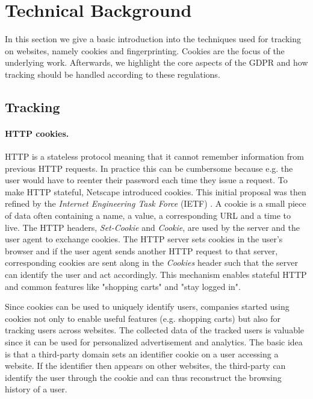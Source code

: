 \section{Technical Background}
\label{sec:background}

In this section we give a basic introduction into the techniques used for tracking on websites, namely cookies and
fingerprinting. Cookies are the focus of the underlying work. Afterwards, we highlight
the core aspects of the GDPR and how tracking should be handled according to these regulations.

\subsection{Tracking}

\paragraph{HTTP cookies.}

HTTP is a stateless protocol meaning that it cannot remember information from previous HTTP requests. In practice this
can be cumbersome because e.g. the user would have to reenter their password each time they issue a request.
To make HTTP stateful, Netscape introduced cookies. This initial proposal was then refined by the
\emph{Internet Engineering Task Force} (IETF) \cite{rfc6265}. A cookie is a small piece of data often containing a name,
a value, a corresponding URL and a time to live. The HTTP headers, \emph{Set-Cookie} and \emph{Cookie}, are used by the server and the user agent to
exchange cookies. The HTTP server sets cookies in the user's browser and if the user agent sends another HTTP
request to that server, corresponding cookies are sent along in the \emph{Cookies} header such that the server can identify the user and act accordingly. This
mechanism enables stateful HTTP and common features like "shopping carts" and "stay logged in".

Since cookies can be used to uniquely identify users, companies started using cookies not only to enable useful features
(e.g. shopping carts) but also for tracking users across websites. The collected data of the tracked
users is valuable since it can be used for
personalized advertisement and analytics. The basic idea is that a third-party domain sets an identifier cookie on a
user accessing a website. If the identifier then appears on other websites, the third-party can identify the user
through the cookie and can thus reconstruct the browsing history of a user.

